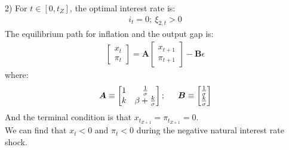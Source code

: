 \documentclass{article}
\numberwithin{equation}{section}
\begin{document}
2) For $t \in [0, t_Z]$, the optimal interest rate is:
	\begin{align*}
		i_t = 0;\ \xi_{2,t} > 0
	\end{align*}
The equilibrium path for inflation and the output gap is:
	\begin{align}
		\begin{bmatrix}
			x_t\\
			\pi_t
		\end{bmatrix} = \boldsymbol{A}
		\begin{bmatrix}
			x_{t+1}\\
			\pi_{t+1}
		\end{bmatrix} - \boldsymbol{B}\epsilon \label{3.3.1-4}
	\end{align}	
where:
	\begin{align*}
		\boldsymbol{A} \equiv \begin{bmatrix}
							  	 1 & \frac{1}{\sigma}\\
				 				 k & \beta + \frac{k}{\sigma}
				 			  \end{bmatrix}; \indent
		\boldsymbol{B} \equiv \begin{bmatrix}
							  	 \frac{1}{\sigma}\\
							  	 \frac{k}{\sigma}
							  \end{bmatrix}
	\end{align*}
And the terminal condition is that $x_{t_{Z+1}} = \pi_{t_{Z+1}} = 0$.\\
We can find that $x_t < 0$ and $\pi_t < 0$ during the negative natural interest rate shock.
\end{document}
